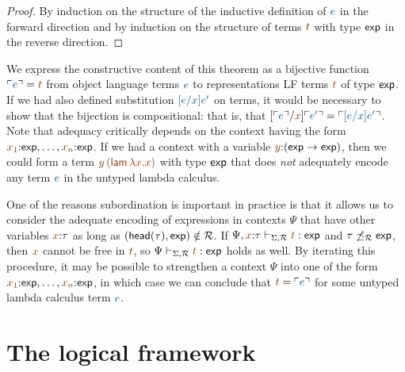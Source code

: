 \begin{proof}
By induction on the structure of the inductive definition of $\obj{e}$
in the forward direction and by induction on the structure of 
terms $\lf{t}$ with type ${\sf exp}$ in the reverse direction.
\end{proof}

We express the constructive content of this theorem as a bijective
function $\interp{e} = \lf{t}$ from object language terms $\obj{e}$ to
representations LF terms $\lf{t}$ of type ${\sf exp}$. If we had also
defined substitution $\obj{[e/x]e'}$ on terms, it would be necessary
to show that the bijection is compositional: that is, that
$[\interp{e}/\lf{x}]\interp{e'} = \interp{[e/x]e'}$.  Note that
adequacy critically depends on the context having the form
$\lf{x_1}{:}{\sf exp},\ldots,\lf{x_n}{:}{\sf exp}$. If we had a
context with a variable $\lf{y}{:}({\sf exp} \rightarrow {\sf exp})$,
then we could form a term $\lf{y\,({\sf lam}\,\lambda x. x)}$ with
type ${\sf exp}$ that does {\it not} adequately encode any term
$\obj{e}$ in the untyped lambda calculus.

One of the reasons subordination is important in practice is that it
allows us to consider the adequate encoding of expressions in contexts
$\Psi$ that have other variables $\lf{x}{:}\tau$ as long as $({\sf
  head}(\tau),{\sf exp}) \notin \mathcal R$. If $\Psi,\lf{x}{:}\tau
\vdash_{\Sigma,\subord} \lf{t} : {\sf exp}$ and $\tau
\not\preceq_\mathcal R {\sf exp}$, then $\lf{x}$ cannot be free in
$\lf{t}$, so $\Psi \vdash_{\Sigma,\subord} \lf{t} : {\sf exp}$ holds as
well. By iterating this procedure, it may be possible to strengthen a
context $\Psi$ into one of the form $\lf{x_1}{:}{\sf
  exp},\ldots,\lf{x_n}{:}{\sf exp}$, in which case we can conclude
that $\lf t = \interp{e}$ for some untyped lambda calculus term $\obj
e$.



\section{The logical framework \sls}
\label{sec:slsframework}

